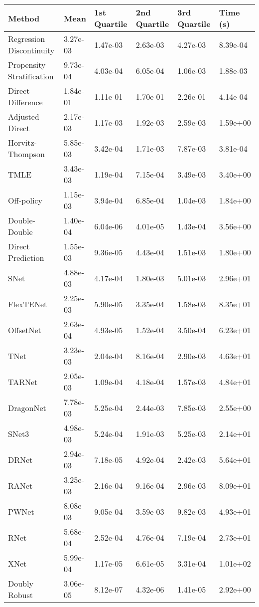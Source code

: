 \begin{tabular}{llllll}
  \toprule
  \textbf{Method} & \textbf{Mean} & \textbf{1st Quartile} & \textbf{2nd Quartile} & \textbf{3rd Quartile} & \textbf{Time (s)} \\ \midrule 
Regression Discontinuity & 3.27e-03 & 1.47e-03 & 2.63e-03 & 4.27e-03 & \cellcolor{bronze!30}8.39e-04\\
Propensity Stratification & 9.73e-04 & 4.03e-04 & 6.05e-04 & 1.06e-03 & 1.88e-03\\
Direct Difference & 1.84e-01 & 1.11e-01 & 1.70e-01 & 2.26e-01 & \cellcolor{silver!30}4.14e-04\\
Adjusted Direct & 2.17e-03 & 1.17e-03 & 1.92e-03 & 2.59e-03 & 1.59e+00\\
Horvitz-Thompson & 5.85e-03 & 3.42e-04 & 1.71e-03 & 7.87e-03 & \cellcolor{gold!30}3.81e-04\\
TMLE & 3.43e-03 & 1.19e-04 & 7.15e-04 & 3.49e-03 & 3.40e+00\\
Off-policy & 1.15e-03 & 3.94e-04 & 6.85e-04 & 1.04e-03 & 1.84e+00\\
Double-Double & \cellcolor{silver!30}1.40e-04 & \cellcolor{silver!30}6.04e-06 & \cellcolor{silver!30}4.01e-05 & \cellcolor{silver!30}1.43e-04 & 3.56e+00\\
Direct Prediction & 1.55e-03 & 9.36e-05 & 4.43e-04 & 1.51e-03 & 1.80e+00\\
SNet & 4.88e-03 & 4.17e-04 & 1.80e-03 & 5.01e-03 & 2.96e+01\\
FlexTENet & 2.25e-03 & 5.90e-05 & 3.35e-04 & 1.58e-03 & 8.35e+01\\
OffsetNet & \cellcolor{bronze!30}2.63e-04 & 4.93e-05 & 1.52e-04 & 3.50e-04 & 6.23e+01\\
TNet & 3.23e-03 & 2.04e-04 & 8.16e-04 & 2.90e-03 & 4.63e+01\\
TARNet & 2.05e-03 & 1.09e-04 & 4.18e-04 & 1.57e-03 & 4.84e+01\\
DragonNet & 7.78e-03 & 5.25e-04 & 2.44e-03 & 7.85e-03 & 2.55e+00\\
SNet3 & 4.98e-03 & 5.24e-04 & 1.91e-03 & 5.25e-03 & 2.14e+01\\
DRNet & 2.94e-03 & 7.18e-05 & 4.92e-04 & 2.42e-03 & 5.64e+01\\
RANet & 3.25e-03 & 2.16e-04 & 9.16e-04 & 2.96e-03 & 8.09e+01\\
PWNet & 8.08e-03 & 9.05e-04 & 3.59e-03 & 9.82e-03 & 4.93e+01\\
RNet & 5.68e-04 & 2.52e-04 & 4.76e-04 & 7.19e-04 & 2.73e+01\\
XNet & 5.99e-04 & \cellcolor{bronze!30}1.17e-05 & \cellcolor{bronze!30}6.61e-05 & \cellcolor{bronze!30}3.31e-04 & 1.01e+02\\
Doubly Robust & \cellcolor{gold!30}3.06e-05 & \cellcolor{gold!30}8.12e-07 & \cellcolor{gold!30}4.32e-06 & \cellcolor{gold!30}1.41e-05 & 2.92e+00\\
\bottomrule
\end{tabular}